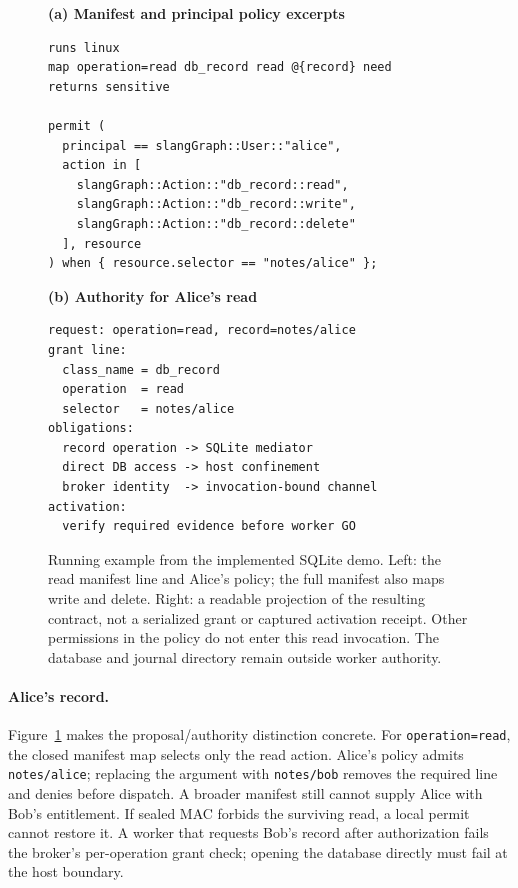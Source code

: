 \documentclass[letterpaper,twocolumn,10pt]{article}
\newcommand{\code}[1]{\texttt{#1}}
\begin{document}
\begin{figure}[t]
\begin{minipage}[t]{0.47\textwidth}
\textbf{(a) Manifest and principal policy excerpts}
\begin{lstlisting}
runs linux
map operation=read db_record read @{record} need
returns sensitive

permit (
  principal == slangGraph::User::"alice",
  action in [
    slangGraph::Action::"db_record::read",
    slangGraph::Action::"db_record::write",
    slangGraph::Action::"db_record::delete"
  ], resource
) when { resource.selector == "notes/alice" };
\end{lstlisting}
\end{minipage}\hfill
\begin{minipage}[t]{0.49\textwidth}
\textbf{(b) Authority for Alice's read}
\begin{lstlisting}
request: operation=read, record=notes/alice
grant line:
  class_name = db_record
  operation  = read
  selector   = notes/alice
obligations:
  record operation -> SQLite mediator
  direct DB access -> host confinement
  broker identity  -> invocation-bound channel
activation:
  verify required evidence before worker GO
\end{lstlisting}
\end{minipage}
\caption{Running example from the implemented SQLite demo. Left: the read
manifest line and Alice's policy; the full manifest also maps write and delete.
Right: a readable projection of the resulting contract, not a serialized grant
or captured activation receipt. Other permissions in the policy do not enter
this read invocation. The database and journal directory remain outside worker
authority.}
\label{fig:record-contract}
\end{figure}

\paragraph{Alice's record.}
Figure~\ref{fig:record-contract} makes the proposal/authority distinction concrete.
For \code{operation=read}, the closed manifest map selects only the read action.
Alice's policy admits \code{notes/alice}; replacing the argument with
\code{notes/bob} removes the required line and denies before dispatch.
A broader manifest still cannot supply Alice with Bob's entitlement. If sealed
MAC forbids the surviving read, a local permit cannot restore it. A worker that
requests Bob's record after authorization fails the broker's per-operation
grant check; opening the database directly must fail at the host boundary.
\end{document}
